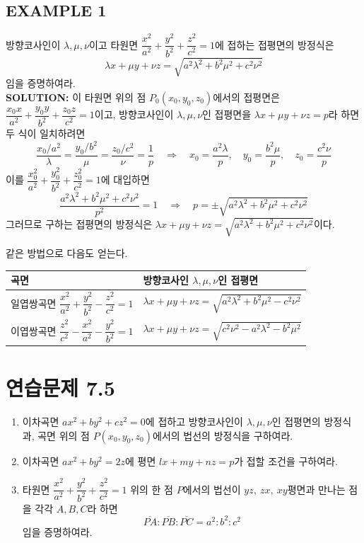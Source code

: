 \documentclass{article}
\theoremstyle{mystyle}
\begin{document}
\subsection*{EXAMPLE 1}
방향코사인이 \(\lambda,\mu,\nu\)이고 타원면 \(\dfrac{x^2}{a^2}+\dfrac{y^2}{b^2}+\dfrac{z^2}{c^2}=1\)에 접하는 접평면의 방정식은
\[
\lambda x+\mu y+\nu z=\sqrt{a^2\lambda^2+b^2\mu^2+c^2\nu^2}
\]
임을 증명하여라.\\
\textbf{SOLUTION:} 이 타원면 위의 점 \(P_0(x_0,y_0,z_0)\)에서의 접평면은 \(\dfrac{x_0x}{a^2}+\dfrac{y_0y}{b^2}+\dfrac{z_0z}{c^2}=1\)이고, 방향코사인이 \(\lambda,\mu,\nu\)인 접평면을 \(\lambda x+\mu y+\nu z=p\)라 하면 두 식이 일치하려면
\[
\frac{x_0/a^2}{\lambda}=\frac{y_0/b^2}{\mu}=\frac{z_0/c^2}{\nu}=\frac{1}{p}
\quad\Longrightarrow\quad
x_0=\frac{a^2\lambda}{p},\quad y_0=\frac{b^2\mu}{p},\quad z_0=\frac{c^2\nu}{p}
\]
이를 \(\dfrac{x_0^2}{a^2}+\dfrac{y_0^2}{b^2}+\dfrac{z_0^2}{c^2}=1\)에 대입하면
\[
\frac{a^2\lambda^2+b^2\mu^2+c^2\nu^2}{p^2}=1
\quad\Longrightarrow\quad
p=\pm\sqrt{a^2\lambda^2+b^2\mu^2+c^2\nu^2}
\]
그러므로 구하는 접평면의 방정식은 \(\lambda x+\mu y+\nu z=\sqrt{a^2\lambda^2+b^2\mu^2+c^2\nu^2}\)이다.

같은 방법으로 다음도 얻는다.
\begin{center}
\renewcommand{\arraystretch}{1.4}
\begin{tabular}{|l|l|}
\hline
곡면 & 방향코사인 $\lambda,\mu,\nu$인 접평면 \\
\hline
일엽쌍곡면 \(\dfrac{x^2}{a^2}+\dfrac{y^2}{b^2}-\dfrac{z^2}{c^2}=1\) & \(\lambda x+\mu y+\nu z=\sqrt{a^2\lambda^2+b^2\mu^2-c^2\nu^2}\) \\
\hline
이엽쌍곡면 \(\dfrac{z^2}{c^2}-\dfrac{x^2}{a^2}-\dfrac{y^2}{b^2}=1\) & \(\lambda x+\mu y+\nu z=\sqrt{c^2\nu^2-a^2\lambda^2-b^2\mu^2}\) \\
\hline
\end{tabular}
\end{center}

\section*{연습문제 7.5}
\begin{enumerate}
    \item 이차곡면 \(ax^2+by^2+cz^2=0\)에 접하고 방향코사인이 \(\lambda,\mu,\nu\)인 접평면의 방정식과, 곡면 위의 점 \(P(x_0,y_0,z_0)\)에서의 법선의 방정식을 구하여라.
    \item 이차곡면 \(ax^2+by^2=2z\)에 평면 \(lx+my+nz=p\)가 접할 조건을 구하여라.
    \item 타원면 \(\dfrac{x^2}{a^2}+\dfrac{y^2}{b^2}+\dfrac{z^2}{c^2}=1\) 위의 한 점 \(P\)에서의 법선이 \(yz,\ zx,\ xy\)평면과 만나는 점을 각각 \(A,B,C\)라 하면
    \[
    \overline{PA}:\overline{PB}:\overline{PC}=a^2:b^2:c^2
    \]
    임을 증명하여라.
\end{enumerate}
\end{document}
